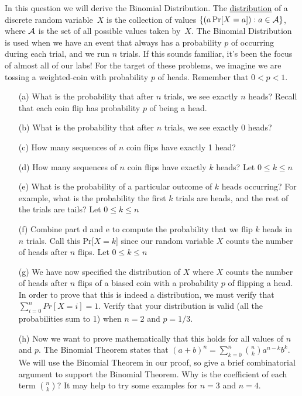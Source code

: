 \documentclass[]{article}
\begin{document}
\begin{qunlist}
\begin{enumerate}[a)]
\end{enumerate}
  
In this question we will derive the Binomial Distribution. The \underline{distribution} of a discrete random variable~$X$ is the collection of values $\{(a \Pr[X=a]):a\in{\cal A}\}$, where ${\cal A}$ is the set of all possible values taken by~$X$. The Binomial Distribution is used when we have an event that always has a probability $p$ of occurring during each trial, and we run $n$ trials. If this sounds familiar, it's been the focus of almost all of our labs! For the target of these problems, we imagine we are tossing a weighted-coin with probability $p$ of heads. Remember that $0 < p < 1$.
\begin{enumerate}
\qpart
\item[(a)] What is the probability that after $n$ trials, we see exactly $n$ heads? Recall that each coin flip has probability $p$ of being a head.
\qpart
\item[(b)] What is the probability that after $n$ trials, we see exactly $0$ heads?
\qpart
\item[(c)] How many sequences of $n$ coin flips have exactly 1 head?
\qpart
\item[(d)] How many sequences of $n$ coin flips have exactly $k$ heads? Let  $0 \leq k \leq n$ 
\qpart
\item[(e)] What is the probability of a particular outcome of $k$ heads occurring? For example, what is the probability the first $k$ trials are heads, and the rest of the trials are tails? Let  $0 \leq k \leq n$ 
\qpart
\item[(f)] Combine part d and e to compute the probability that we flip $k$ heads in $n$ trials. Call this Pr[$X = k$] since our random variable $X$ counts the number of heads after $n$ flips. Let  $0 \leq k \leq n$ 
\qpart
\item[(g)] We have now specified the distribution of $X$ where $X$ counts the number of heads after $n$ flips of a biased coin with a probability $p$ of flipping a head. In order to prove that this is indeed a distribution, we must verify that $\sum\nolimits_{i=0}^n Pr[X=i] = 1$. Verify that your distribution is valid (all the probabilities sum to 1) when $n=2$ and $p=1/3$.
\qpart
\item[(h)] Now we want to prove mathematically that this holds for all values of $n$ and $p$. The Binomial Theorem states that $(a+b)^n = \sum\nolimits_{k=0}^n \binom{n}{k} a^{n-k}b^k $. We will use the Binomial Theorem in our proof, so give a brief combinatorial argument to support the Binomial Theorem. Why is the coefficient of each term $\binom{n}{k}$? It may help to try some examples for $n=3$ and $n=4$.

\end{enumerate}
\end{qunlist}
\end{document}
